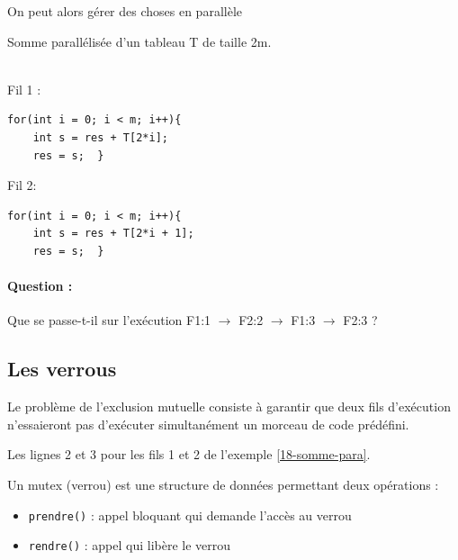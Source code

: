 \begin{idee}
	On peut alors gérer des choses en parallèle
\end{idee}

\begin{example}
	\label{18-somme-para} \normalfont
	Somme parallélisée d'un tableau T de taille 2m.\\\\
	\begin{minipage}{0.45\linewidth}
		Fil 1 :
		\begin{lstlisting}[style=CStyle]
for(int i = 0; i < m; i++){
	int s = res + T[2*i];
	res = s;  }\end{lstlisting}
	\end{minipage} \quad
	\begin{minipage}{0.45\linewidth}
		Fil 2:
	\begin{lstlisting}[style=CStyle]
for(int i = 0; i < m; i++){
	int s = res + T[2*i + 1];
	res = s;  }\end{lstlisting}
	\end{minipage}
	
	\paragraph{Question :} Que se passe-t-il sur l'exécution F1:1 $\to$ F2:2 $\to$ F1:3 $\to$ F2:3 ?
\end{example}

\subsection{Les verrous}

\begin{definition}
	Le problème de l'exclusion mutuelle consiste à garantir que deux fils d'exécution n'essaieront pas d'exécuter simultanément un morceau de code prédéfini.
\end{definition}

\begin{example}
	Les lignes 2 et 3 pour les fils 1 et 2 de l'exemple \ref{18-somme-para}.
\end{example}

\begin{definition}
	Un mutex (verrou) est une structure de données permettant deux opérations : \begin{itemize}
		\item \texttt{prendre()} : appel bloquant qui demande l'accès au verrou
		\item \texttt{rendre()} : appel qui libère le verrou
	\end{itemize}
\end{definition}


